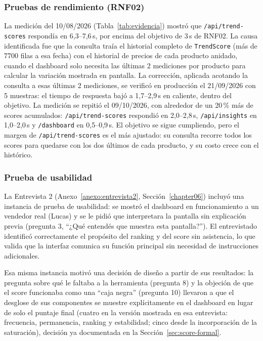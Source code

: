 \subsubsection*{Pruebas de rendimiento (RNF02)}

La medición del 10/08/2026 (Tabla~\ref{tab:evidencia}) mostró que \texttt{/api/trend-scores} respondía en 6,3--7,6\,s, por encima del objetivo de 3\,s de RNF02. La causa identificada fue que la consulta traía el historial completo de \texttt{TrendScore} (más de 7700 filas a esa fecha) con el historial de precios de cada producto anidado, cuando el dashboard solo necesita las últimas 2 mediciones por producto para calcular la variación mostrada en pantalla. La corrección, aplicada acotando la consulta a esas últimas 2 mediciones, se verificó en producción el 21/09/2026 con 5 muestras: el tiempo de respuesta bajó a 1,7--2,9\,s en caliente, dentro del objetivo. La medición se repitió el 09/10/2026, con alrededor de un 20\,\% más de scores acumulados: \texttt{/api/trend-scores} respondió en 2,0--2,8\,s, \texttt{/api/insights} en 1,0--2,0\,s y \texttt{/dashboard} en 0,5--0,9\,s. El objetivo se sigue cumpliendo, pero el margen de \texttt{/api/trend-scores} es el más ajustado: su consulta recorre todos los scores para quedarse con los dos últimos de cada producto, y su costo crece con el histórico.

\subsubsection*{Prueba de usabilidad}

La Entrevista 2 (Anexo~\ref{anexo:entrevista2}, Sección~\ref{chapter06}) incluyó una instancia de prueba de usabilidad: se mostró el dashboard en funcionamiento a un vendedor real (Lucas) y se le pidió que interpretara la pantalla sin explicación previa (pregunta 3, ``¿Qué entendés que muestra esta pantalla?''). El entrevistado identificó correctamente el propósito del ranking y del score sin asistencia, lo que valida que la interfaz comunica su función principal sin necesidad de instrucciones adicionales.

Esa misma instancia motivó una decisión de diseño a partir de sus resultados: la pregunta sobre qué le faltaba a la herramienta (pregunta 8) y la objeción de que el score funcionaba como una ``caja negra'' (pregunta 10) llevaron a que el desglose de sus componentes se muestre explícitamente en el dashboard en lugar de solo el puntaje final (cuatro en la versión mostrada en esa entrevista: frecuencia, permanencia, ranking y estabilidad; cinco desde la incorporación de la saturación), decisión ya documentada en la Sección~\ref{sec:score-formal}.

